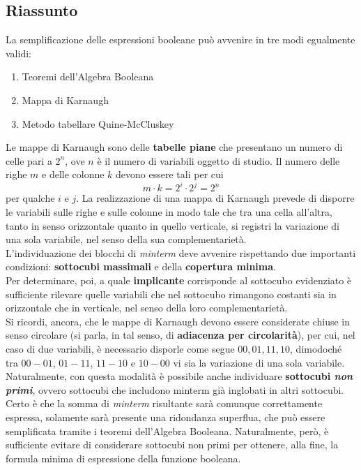 \documentclass[a4paper]{extarticle}
\begin{document}
\subsection{Riassunto}
La semplificazione delle espressioni booleane può avvenire in tre modi egualmente validi:
\begin{enumerate}
    \item Teoremi dell'Algebra Booleana
    \item Mappa di Karnaugh
    \item Metodo tabellare Quine-McCluskey
\end{enumerate}
Le mappe di Karnaugh sono delle \textbf{tabelle piane} che presentano un numero di celle pari a \(2^n\), ove \(n\) è il numero di variabili oggetto di studio. Il numero delle righe $m$ e delle colonne $k$ devono essere tali per cui
\[m \cdot k = 2^i \cdot 2^j = 2^n\]
per qualche $i$ e $j$. La realizzazione di una mappa di Karnaugh prevede di disporre le variabili sulle righe e sulle colonne in modo tale che tra una cella all'altra, tanto in senso orizzontale quanto in quello verticale, si registri la variazione di una sola variabile, nel senso della sua complementarietà.\\
L'individuazione dei blocchi di \textit{minterm} deve avvenire rispettando due importanti condizioni: \textbf{sottocubi massimali} e della \textbf{copertura minima}.\\
Per determinare, poi, a quale \textbf{implicante} corrisponde al sottocubo evidenziato è sufficiente rilevare quelle variabili che nel sottocubo rimangono costanti sia in orizzontale che in verticale, nel senso della loro complementarietà.\\
Si ricordi, ancora, che le mappe di Karnaugh devono essere considerate chiuse in senso circolare (si parla, in tal senso, di \textbf{adiacenza per circolarità}), per cui, nel caso di due variabili, è necessario disporle come segue \(00, 01, 11, 10\), dimodoché tra \(00 - 01\), \(01 - 11\), \(11 - 10\) e \(10 - 00\) vi sia la variazione di una sola variabile.\\
Naturalmente, con questa modalità è possibile anche individuare \textbf{sottocubi \textit{non primi}}, ovvero sottocubi che includono minterm già inglobati in altri sottocubi. Certo è che la somma di \emph{minterm} risultante sarà comunque correttamente espressa, solamente sarà presente una ridondanza superflua, che può essere semplificata tramite i teoremi dell'Algebra Booleana. Naturalmente, però, è sufficiente evitare di considerare sottocubi non primi per ottenere, alla fine, la formula minima di espressione della funzione booleana.\\
\end{document}
